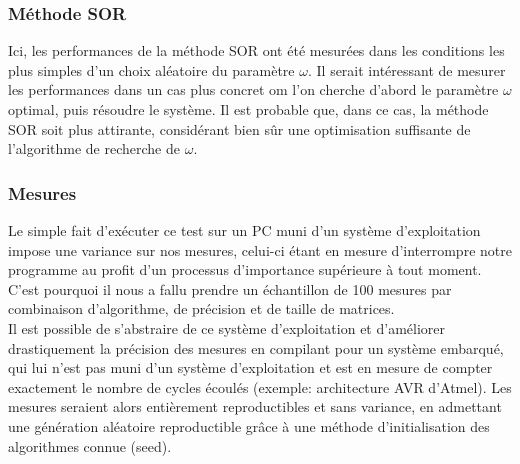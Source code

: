\subsubsection{Méthode SOR}
Ici, les performances de la méthode SOR ont été mesurées dans les conditions les plus simples d'un choix aléatoire du paramètre $\omega$. Il serait intéressant de mesurer les performances dans un cas plus concret om l'on cherche d'abord le paramètre $\omega$ optimal, puis résoudre le système. Il est probable que, dans ce cas, la méthode SOR soit plus attirante, considérant bien sûr une optimisation suffisante de l'algorithme de recherche de $\omega$.

\subsubsection{Mesures}
Le simple fait d'exécuter ce test sur un PC muni d'un système d'exploitation impose une variance sur nos mesures, celui-ci étant en mesure d'interrompre notre programme au profit d'un processus d'importance supérieure à tout moment. C'est pourquoi il nous a fallu prendre un échantillon de 100 mesures par combinaison d'algorithme, de précision et de taille de matrices.\\

Il est possible de s'abstraire de ce système d'exploitation et d'améliorer drastiquement la précision des mesures en compilant pour un système embarqué, qui lui n'est pas muni d'un système d'exploitation et est en mesure de compter exactement le nombre de cycles écoulés (exemple: architecture AVR d'Atmel). Les mesures seraient alors entièrement reproductibles et sans variance, en admettant une génération aléatoire reproductible grâce à une méthode d'initialisation des algorithmes connue (seed). 


